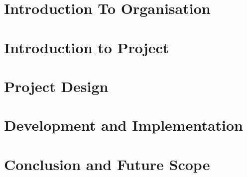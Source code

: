 \documentclass[12pt,includeheadfoot,a4paper]{report}
\begin{document}


\thispagestyle{empty}
\pagetitle
\newpage
{}
\cfoot{\thepage}



\newpage


\newpage
\tableofcontents
\newpage
\listoffigures
\newpage
\listoftables
\newpage


\cfoot{\thepage}


\newpage
\chapter{Introduction To Organisation}

\newpage

\chapter{Introduction to Project}

%
%
%
\chapter{Project Design}



%
\chapter{Development and Implementation}





\chapter{Conclusion and Future Scope}



%

\end{document}
